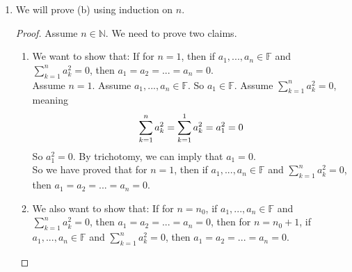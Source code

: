 \documentclass{article}
\theoremstyle{claim}
\theoremstyle{definition}
\begin{document}
\begin{enumerate}
\begin{enumerate}
\begin{proof}
\begin{enumerate}
                        We know $\sum\limits_{k=1}^{n_0} a_k^2 \ge 0$ by our inductive hypothesis. We also know $a_{n_0 + 1}^2 \ge 0$. So we can conclude that
                        \begin{equation*}
                            \sum\limits_{k=1}^{n_0} a_k^2 + a_{n_0 + 1}^2 = \sum\limits_{k=1}^{n_0 + 1} a_k^2 \ge 0
                        \end{equation*}
                       So we have proved that: If for $n = n_0$, if $a_1 \in \mathbb{F}; ... ; a_n \in \mathbb{F}$, then $\sum\limits_{k=1}^n a_k^2 \ge 0$ then for $n = n_0 + 1$, if $a_1, ..., a_n \in \mathbb{F}$, then $\sum\limits_{k=1}^n a_k^2 \ge 0$.\\  
                    \end{enumerate}
                    Proving (i) and (ii) thus completes our proof by induction on $n$.
                \end{proof}
            \item We will prove (b) using induction on $n$.
                \begin{proof}
                    Assume $n \in \mathbb{N}$. We need to prove two claims.
                    \begin{enumerate}
                        \item We want to show that: If for $n = 1$, then if $a_1, ..., a_n \in \mathbb{F}$ and $\sum\limits_{k=1}^n a_k^2 = 0$, then $a_1 = a_2 = ... = a_n = 0$.\\
                            Assume $n = 1$. Assume $a_1, ..., a_n \in \mathbb{F}$. So $a_1 \in \mathbb{F}$. Assume $\sum\limits_{k=1}^n a_k^2 = 0$, meaning
                            \begin{equation*}
                                \sum\limits_{k=1}^n a_k^2 = \sum\limits_{k=1}^1 a_k^2 = a_1^2 = 0\\
                            \end{equation*}
                            So $a_1^2 = 0$. By trichotomy, we can imply that $a_1 = 0$.\\
                            So we have proved that for $n = 1$, then if $a_1, ..., a_n \in \mathbb{F}$ and $\sum\limits_{k=1}^n a_k^2 = 0$, then $a_1 = a_2 = ... = a_n = 0$.\\
                        \item We also want to show that: If for $n = n_0$, if $a_1, ..., a_n \in \mathbb{F}$ and $\sum\limits_{k=1}^n a_k^2 = 0$, then $a_1 = a_2 = ... = a_n = 0$, then for $n = n_0 + 1$, if $a_1, ..., a_n \in \mathbb{F}$ and $\sum\limits_{k=1}^n a_k^2 = 0$, then $a_1 = a_2 = ... = a_n = 0$.\\

\end{enumerate}
\end{proof}
\end{enumerate}
\end{enumerate}
\end{document}
